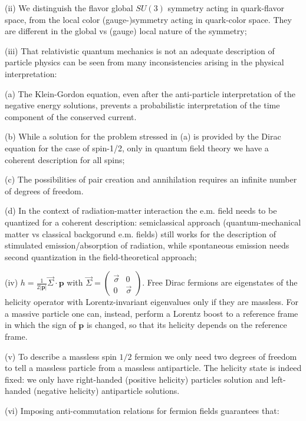 \documentclass[10pt, letterpaper]{article}
\begin{document}
(ii) We distinguish the flavor global $S U(3)$ symmetry acting in quark-flavor space, from the local color (gauge-)symmetry acting in quark-color space. They are different in the global vs (gauge) local nature of the symmetry;


(iii) That relativistic quantum mechanics is not an adequate description of particle physics can be seen from many inconsistencies arising in the physical interpretation:

(a) The Klein-Gordon equation, even after the anti-particle interpretation of the negative energy solutions, prevents a probabilistic interpretation of the time component of the conserved current.

(b) While a solution for the problem stressed in (a) is provided by the Dirac equation for the case of spin-1/2, only in quantum field theory we have a coherent description for all spins;

(c) The possibilities of pair creation and annihilation requires an infinite number of degrees of freedom.

(d) In the context of radiation-matter interaction the e.m. field needs to be quantized for a coherent description: semiclassical approach (quantum-mechanical matter vs classical backgorund e.m. fields) still works for the description of stimulated emission/absorption of radiation, while spontaneous emission needs second quantization in the field-theoretical approach;

(iv) $h=\frac{1}{2|\mathbf{p}|} \vec{\Sigma} \cdot \mathbf{p}$ with $\vec{\Sigma}=\left(\begin{array}{cc}\vec{\sigma} & 0 \\ 0 & \vec{\sigma}\end{array}\right)$. Free Dirac fermions are eigenstates of the helicity operator with Lorentz-invariant eigenvalues only if they are massless. For a massive particle one can, instead, perform a Lorentz boost to a reference frame in which the sign of $\mathbf{p}$ is changed, so that its helicity depends on the reference frame.

(v) To describe a massless spin $1 / 2$ fermion we only need two degrees of freedom to tell a massless particle from a massless antiparticle. The helicity state is indeed fixed: we only have right-handed (positive helicity) particles solution and left-handed (negative helicity) antiparticle solutions.


(vi) Imposing anti-commutation relations for fermion fields guarantees that:
\end{document}
